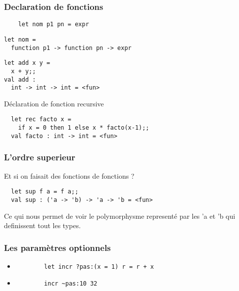 \begin{frame}[fragile]
  \frametitle{Declaration de fonctions}
    \begin{lstlisting}
	let nom p1 pn = expr
    \end{lstlisting}
\begin{lstlisting}
let nom = 
  function p1 -> function pn -> expr
  \end{lstlisting}
  \vspace{0.4cm}
  \begin{lstlisting}
let add x y = 
  x + y;;
val add : 
  int -> int -> int = <fun>
  \end{lstlisting}
  Déclaration de fonction recursive 
  \begin{lstlisting}
  let rec facto x = 
    if x = 0 then 1 else x * facto(x-1);;
  val facto : int -> int = <fun>
  \end{lstlisting}
\end{frame}

\begin{frame}[fragile]
  \frametitle{L'ordre superieur}
  Et si on faisait des fonctions de fonctions ? 
 \begin{lstlisting}
  let sup f a = f a;;
  val sup : ('a -> 'b) -> 'a -> 'b = <fun>
 \end{lstlisting}
 Ce qui nous permet de voir le polymorphysme representé par les 'a et 'b qui definissent tout les types.
\end{frame}

\begin{frame}[fragile]
	\frametitle{Les paramètres optionnels}
	\begin{itemize}	

	\item 	\begin{lstlisting}
		let incr ?pas:(x = 1) r = r + x
		\end{lstlisting}

	\item 	\begin{lstlisting}
		incr ~pas:10 32
		\end{lstlisting}

\end{itemize}
\end{frame}

